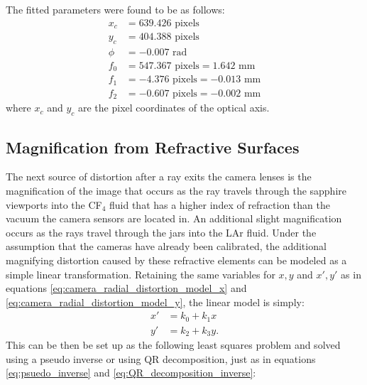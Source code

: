 \documentclass[11pt, letterpaper]{extarticle} %
\begin{document}
The fitted parameters were found to be as follows:
\begin{align*}
    x_c &= 639.426 \text{ pixels} \\
    y_c &= 404.388 \text{ pixels} \\
    \phi &= -0.007 \text{ rad} \\ 
    f_0 &= 547.367 \text{ pixels} = 1.642 \text{ mm} \\
    f_1 &= -4.376 \text{ pixels} = -0.013 \text{ mm} \\
    f_2 &= -0.607 \text{ pixels} = -0.002 \text{ mm}
\end{align*}
where $x_c$ and $y_c$ are the pixel coordinates of the optical axis.

\subsection{Magnification from Refractive Surfaces} \label{subsec:magnification_from_refractive_surfaces}
The next source of distortion after a ray exits the camera lenses is the magnification of the image that occurs as the ray travels through the sapphire viewports into the CF$_4$ fluid that has a higher index of refraction than the vacuum the camera sensors are located in. An additional slight magnification occurs as the rays travel through the jars into the LAr fluid. Under the assumption that the cameras have already been calibrated, the additional magnifying distortion caused by these refractive elements can be modeled as a simple linear transformation. Retaining the same variables for $x, y$ and $x', y'$ as in equations \ref{eq:camera_radial_distortion_model_x} and \ref{eq:camera_radial_distortion_model_y}, the linear model is simply:
\begin{align} \label{eq:linear_distortion_mapping}
    x' &= k_0 + k_1 x \\
    y' &= k_2 + k_3 y.
\end{align}
This can be then be set up as the following least squares problem and solved using a pseudo inverse or using QR decomposition, just as in equations \ref{eq:psuedo_inverse} and \ref{eq:QR_decomposition_inverse}:
\end{document}
